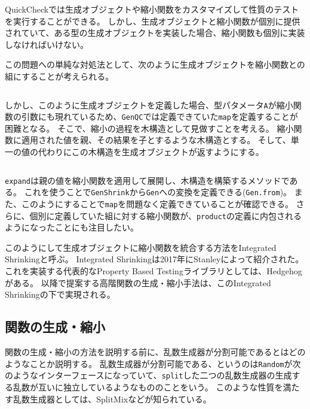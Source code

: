\documentclass[submit,PRO,onecolumn]{ipsj}
\theoremstyle{definition}
\begin{document}
QuickCheckでは生成オブジェクトや縮小関数をカスタマイズして性質のテストを実行することができる。
しかし、生成オブジェクトと縮小関数が個別に提供されていて、ある型の生成オブジェクトを実装した場合、縮小関数も個別に実装しなければいけない。

この問題への単純な対処法として、次のように生成オブジェクトを縮小関数との組にすることが考えられる。

\inputminted[breaklines,firstline=49,lastline=49]{scala}{../src/main/scala/minicheck.scala}

しかし、このように生成オブジェクトを定義した場合、型パタメータ\texttt{A}が縮小関数の引数にも現れているため、\texttt{GenQC}では定義できていた\texttt{map}を定義することが困難となる。
そこで、縮小の過程を木構造として見做すことを考える。
縮小関数に適用された値を親、その結果を子とするような木構造とする。
そして、単一の値の代わりにこの木構造を生成オブジェクトが返すようにする。

\inputminted[breaklines,firstline=51,lastline=66]{scala}{../src/main/scala/minicheck.scala}

\texttt{expand}は親の値を縮小関数を適用して展開し、木構造を構築するメソッドである。
これを使うことで\texttt{GenShrink}から\texttt{Gen}への変換を定義できる(\texttt{Gen.from})。
また、このようにすることで\texttt{map}を問題なく定義できていることが確認できる。
さらに、個別に定義していた組に対する縮小関数が、\texttt{product}の定義に内包されるようになったことにも注目したい。

このようにして生成オブジェクトに縮小関数を統合する方法をIntegrated Shrinkingと呼ぶ。
Integrated Shrinkingは2017年にStanleyによって紹介された\cite{stanley_gens_2017}。
これを実装する代表的なProperty Based Testingライブラリとしては、Hedgehog\cite{hedgehog_online}がある。
以降で提案する高階関数の生成・縮小手法は、このIntegrated Shrinkingの下で実現される。

\subsection{関数の生成・縮小}

関数の生成・縮小の方法を説明する前に、乱数生成器が分割可能であるとはどのようなことか説明する。
乱数生成器が分割可能である、というのは\texttt{Random}が次のようなインターフェースになっていて、\texttt{split}した二つの乱数生成器の生成する乱数が互いに独立しているようなもののことをいう。
このような性質を満たす乱数生成器としては、SplitMix\cite{steele_jr_fast_2014}などが知られている。

\inputminted[breaklines,firstline=4,lastline=7]{scala}{../src/main/scala/minicheck.scala}
\end{document}

